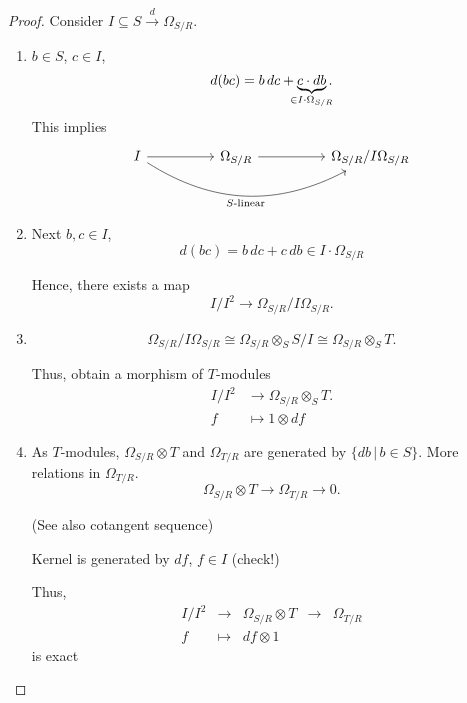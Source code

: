 \documentclass[12pt]{article}
\theoremstyle{definition}
\begin{document}
\begin{proof}
Consider $I\subseteq S\xrightarrow d\Omega_{S/R}$.

\begin{enumerate}[label=\alph*)]
\item $b\in S$, $c\in I$,
\[d(bc)=b\,dc+\underbrace{c\cdot db}_{\mathclap{\in I\cdot\Omega_{S/R}}}.\]
This implies
\[\begin{tikzcd}I\arrow[rr]\arrow[rrrr,bend right,"S\text{-linear}",swap]&&\Omega_{S/R}\arrow[rr]&&\Omega_{S/R}/I\Omega_{S/R}\end{tikzcd}\]

\item Next $b,c\in I$,
\[d(bc)=b\,dc+c\,db\in I\cdot\Omega_{S/R}\]

Hence, there exists a map
\[I/I^2\longrightarrow\Omega_{S/R}/I\Omega_{S/R}.\]

\item
\[\Omega_{S/R}/I\Omega_{S/R}\cong\Omega_{S/R}\otimes_SS/I\cong\Omega_{S/R}\otimes_ST.\]

Thus, obtain a morphism of $T$-modules
\begin{align*}
I/I^2&\longrightarrow\Omega_{S/R}\otimes_ST.\\f&\longmapsto1\otimes df
\end{align*}

\item As $T$-modules, $\Omega_{S/R}\otimes T$ and $\Omega_{T/R}$ are generated by $\{db\,|\,b\in S\}$. More relations in $\Omega_{T/R}$.
\[\Omega_{S/R}\otimes T\longrightarrow\Omega_{T/R}\longrightarrow0.\]

(See also cotangent sequence)

Kernel is generated by $df$, $f\in I$ (check!)

Thus,
\[\begin{array}{rclcc}I/I^2&\longrightarrow&\Omega_{S/R}\otimes T&\longrightarrow&\Omega_{T/R}\\f&\longmapsto&df\otimes1\end{array}\]
is exact
\end{enumerate}
\end{proof}
\end{document}

